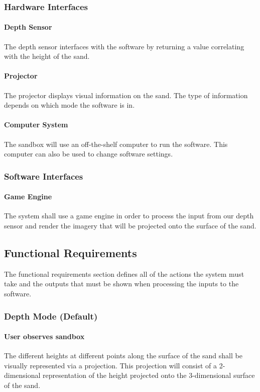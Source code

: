 \documentclass[onecolumn, draftclsnofoot,10pt, compsoc]{IEEEtran}
\begin{document}
\subsubsection{Hardware Interfaces}
\paragraph{Depth Sensor}
The depth sensor interfaces with the software by returning a value correlating with the height of the sand.
\paragraph{Projector}
The projector displays visual information on the sand. The type of information depends on which mode the software is in.
\paragraph{Computer System}
The sandbox will use an off-the-shelf computer to run the software. This computer can also be used to change software settings.

\subsubsection{Software Interfaces}
\paragraph{Game Engine}
The system shall use a game engine in order to process the input from our depth sensor and render the imagery that will be projected onto the surface of the sand.  

\subsection{Functional Requirements}
The functional requirements section defines all of the actions the system must take and the outputs that must be shown when processing the inputs to the software.

\subsubsection{Depth Mode (Default)}

\paragraph{User observes sandbox}
The different heights at different points along the surface of the sand shall be visually represented via a projection.  This projection will consist of a 2-dimensional representation of the height projected onto the 3-dimensional surface of the sand.
\end{document}
